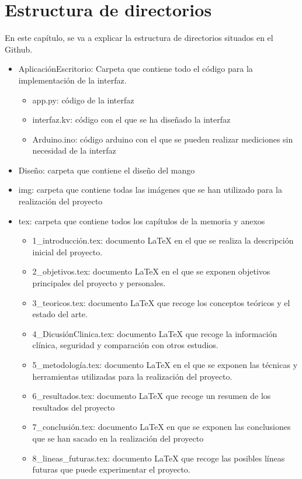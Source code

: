 \section{Estructura de directorios}
En este capítulo, se va a explicar la estructura de directorios situados en el Github.
\begin{itemize}
    \item AplicaciónEscritorio: Carpeta que contiene todo el código para la implementación de la interfaz.
    \begin{itemize}
        \item app.py: código de la interfaz
        \item interfaz.kv: código con el que se ha diseñado la interfaz
        \item Arduino.ino: código arduino con el que se pueden realizar mediciones sin necesidad de la interfaz
    \end{itemize}
    \item Diseño: carpeta que contiene el diseño del mango
    \item img: carpeta que contiene todas las imágenes que se han utilizado para la realización del proyecto 
    \item tex: carpeta que contiene todos los capítulos de la memoria y anexos
    \begin{itemize}
        \item 1\_introducción.tex: documento LaTeX en el que se realiza la descripción inicial del proyecto.
        \item 2\_objetivos.tex: documento LaTeX en el que se exponen objetivos principales del proyecto y personales.
        \item 3\_teoricos.tex: documento LaTeX que recoge los conceptos teóricos y el estado del arte.
        \item 4\_DicusiónClinica.tex: documento LaTeX que recoge la información clínica, seguridad y comparación con otros estudios.
        \item 5\_metodología.tex: documento LaTeX en el que se exponen las técnicas y herramientas utilizadas para la realización del proyecto.
        \item 6\_resultados.tex: documento LaTeX que recoge un resumen de los resultados del proyecto
        \item 7\_conclusión.tex: documento LaTeX en que se exponen las conclusiones que se han sacado en la realización del proyecto
        \item 8\_lineas\_futuras.tex: documento LaTeX que recoge las posibles líneas futuras que puede experimentar el proyecto.

\end{itemize}
\end{itemize}
